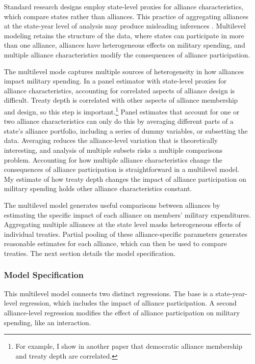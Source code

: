 \documentclass[12pt]{article}
\begin{document}
Standard research designs employ state-level proxies for alliance characteristics, which compare states rather than alliances.
This practice of aggregating alliances at the state-year level of analysis may produce misleading inferences \citep[pg. 356]{McElreath2016}.
Multilevel modeling retains the structure of the data, where states can participate in more than one alliance, alliances have heterogeneous effects on military spending, and multiple alliance characteristics modify the consequences of alliance participation. 


The multilevel mode captures multiple sources of heterogeneity in how alliances impact military spending. 
In a panel estimator with state-level proxies for alliance characteristics, accounting for correlated aspects of alliance design is difficult. 
Treaty depth is correlated with other aspects of alliance membership and design, so this step is important.\footnote{For example, I show in another paper that democratic alliance membership and treaty depth are correlated.}
Panel estimates that account for one or two alliance characteristics can only do this by averaging different parts of a state's alliance portfolio, including a series of dummy variables, or subsetting the data.
Averaging reduces the alliance-level variation that is theoretically interesting, and analysis of multiple subsets risks a multiple comparisons problem.  
Accounting for how multiple alliance characteristics change the consequences of alliance participation is straightforward in a multilevel model. 
My estimate of how treaty depth changes the impact of alliance participation on military spending holds other alliance characteristics constant. 


The multilevel model generates useful comparisons between alliances by estimating the specific impact of each alliance on members' military expenditures. 
Aggregating multiple alliances at the state level masks heterogeneous effects of individual treaties. 
Partial pooling of these alliance-specific parameters generates reasonable estimates for each alliance, which can then be used to compare treaties. 
The next section details the model specification. 
 


\subsubsection{Model Specification} 

This multilevel model connects two distinct regressions. 
The base is a state-year-level regression, which includes the impact of alliance participation.
A second alliance-level regression modifies the effect of alliance participation on military spending, like an interaction. 
\end{document}
